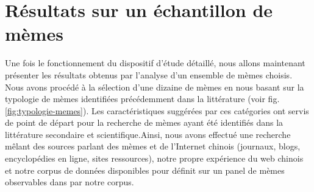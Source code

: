 \section{Résultats sur un échantillon de mèmes}
\label{sec:results-memes}

Une fois le fonctionnement du dispositif d'étude détaillé, nous allons maintenant présenter les résultats obtenus par l'analyse d'un ensemble de mèmes choisis. Nous avons procédé à la sélection d'une dizaine de mèmes en  nous basant sur la typologie de mèmes identifiées précédemment dans la littérature (voir fig. \ref{fig:typologie-memes}). Les caractéristiques suggérées par ces catégories ont servis de point de départ pour la recherche de mèmes ayant été identifiés dans la littérature secondaire et scientifique.Ainsi, nous avons effectué une recherche mêlant des sources parlant des mèmes et de l{\textquoteright}Internet chinois (journaux, blogs, encyclopédies en ligne, sites ressources), notre propre expérience du web chinois et notre corpus de données disponibles pour définit sur un panel de mèmes observables dans par notre corpus. 



